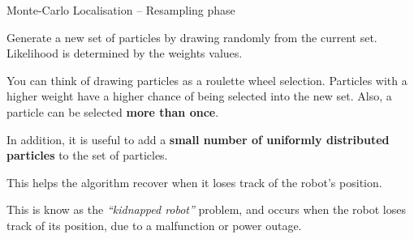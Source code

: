 \documentclass[compress]{beamer}
\begin{document}
\begin{frame}{Monte-Carlo Localisation -- Resampling phase}

    Generate a new set of particles by drawing randomly from the current
    set. Likelihood is determined by the weights values.


    \begin{overprint}
        \vspace{1em}
        \small
        You can think of drawing particles as a roulette wheel selection.
        Particles with a higher weight have a higher chance of being
        selected into the new set. Also, a particle can be selected \textbf{more than
        once}.

        \centering

        \vspace{2em}
        In addition, it is useful to add a \textbf{small number of uniformly distributed
        particles} to the set of particles.

        This helps the algorithm recover when it loses track of the robot's
        position.

        \vspace{1em}
        \small
        This is know as the \emph{``kidnapped robot''} problem, and occurs when the
        robot loses track of its position, due to a malfunction or power
        outage.


    \end{overprint}

\end{frame}
\end{document}
